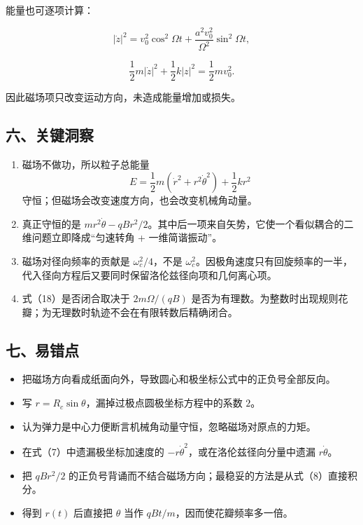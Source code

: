 \documentclass[12pt,a4paper,UTF8]{ctexart}
\newcommand{\tightlist}{\setlength{\itemsep}{0pt}\setlength{\parskip}{0pt}}
\begin{document}
能量也可逐项计算：

\[|\dot z|^2=v_0^2\cos^2\Omega t+
\frac{a^2v_0^2}{\Omega^2}\sin^2\Omega t,\]

\[\frac12m|\dot z|^2+\frac12k|z|^2
=\frac12mv_0^2.\]

因此磁场项只改变运动方向，未造成能量增加或损失。

\subsection{六、关键洞察}\label{ux516dux5173ux952eux6d1eux5bdf-3}

\begin{enumerate}
\def\labelenumi{\arabic{enumi}.}
\tightlist
\item
  磁场不做功，所以粒子总能量
  \[E=\frac12m(\dot r^2+r^2\dot\theta^2)+\frac12kr^2\]
  守恒；但磁场会改变速度方向，也会改变机械角动量。
\item
  真正守恒的是
  \(mr^2\dot\theta-qBr^2/2\)。其中后一项来自矢势，它使一个看似耦合的二维问题立即降成``匀速转角
  + 一维简谐振动''。
\item
  磁场对径向频率的贡献是 \(\omega_c^2/4\)，不是
  \(\omega_c^2\)。因极角速度只有回旋频率的一半，代入径向方程后又要同时保留洛伦兹径向项和几何离心项。
\item
  式（18）是否闭合取决于 \(2m\Omega/(qB)\)
  是否为有理数。为整数时出现规则花瓣；为无理数时轨迹不会在有限转数后精确闭合。
\end{enumerate}

\subsection{七、易错点}\label{ux4e03ux6613ux9519ux70b9-3}

\begin{itemize}
\tightlist
\item
  把磁场方向看成纸面向外，导致圆心和极坐标公式中的正负号全部反向。
\item
  写 \(r=R_c\sin\theta\)，漏掉过极点圆极坐标方程中的系数 \(2\)。
\item
  认为弹力是中心力便断言机械角动量守恒，忽略磁场对原点的力矩。
\item
  在式（7）中遗漏极坐标加速度的
  \(-r\dot\theta^2\)，或在洛伦兹径向分量中遗漏 \(r\dot\theta\)。
\item
  把 \(qBr^2/2\)
  的正负号背诵而不结合磁场方向；最稳妥的方法是从式（8）直接积分。
\item
  得到 \(r(t)\) 后直接把 \(\theta\) 当作
  \(qBt/m\)，因而使花瓣频率多一倍。
\end{itemize}
\end{document}
